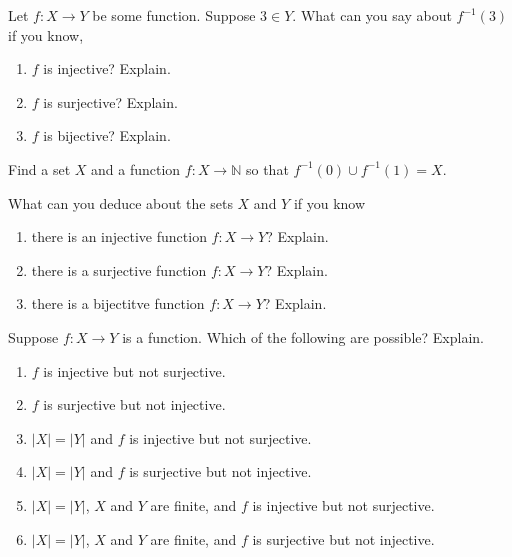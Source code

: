 \documentclass[10pt,]{book}
\theoremstyle{plain}
\theoremstyle{definition}
\theoremstyle{definition}
\theoremstyle{definition}
\theoremstyle{definition}
\numberwithin{equation}{chapter}
\def\N{\mathbb N}
\def\inv{^{-1}}
\begin{document}
\begin{divisionexercise}{9}\hypertarget{exercise-211}{}
\hypertarget{p-1838}{}%
Let \(f:X \to Y\) be some function. Suppose \(3 \in Y\). What can you say about \(f\inv(3)\) if you know, \leavevmode%
\begin{enumerate}[label=(\alph*)]
\item\hypertarget{li-605}{}\hypertarget{p-1839}{}%
\(f\) is injective? Explain.%
\item\hypertarget{li-606}{}\hypertarget{p-1840}{}%
\(f\) is surjective? Explain.%
\item\hypertarget{li-607}{}\hypertarget{p-1841}{}%
\(f\) is bijective? Explain.%
\end{enumerate}
%
\end{divisionexercise}%
\begin{divisionexercise}{10}\hypertarget{exercise-212}{}
\hypertarget{p-1846}{}%
Find a set \(X\) and a function \(f:X \to \N\) so that \(f\inv(0) \cup f\inv(1) = X\).%
\end{divisionexercise}%
\begin{divisionexercise}{11}\hypertarget{exercise-213}{}
\hypertarget{p-1848}{}%
What can you deduce about the sets \(X\) and \(Y\) if you know \textellipsis{} \leavevmode%
\begin{enumerate}[label=(\alph*)]
\item\hypertarget{li-611}{}\hypertarget{p-1849}{}%
there is an injective function \(f:X \to Y\)? Explain.%
\item\hypertarget{li-612}{}\hypertarget{p-1850}{}%
there is a surjective function \(f:X \to Y\)? Explain.%
\item\hypertarget{li-613}{}\hypertarget{p-1851}{}%
there is a bijectitve function \(f:X \to Y\)? Explain.%
\end{enumerate}
%
\end{divisionexercise}%
\begin{divisionexercise}{12}\hypertarget{exercise-214}{}
\hypertarget{p-1856}{}%
Suppose \(f:X \to Y\) is a function. Which of the following are possible? Explain. \leavevmode%
\begin{enumerate}[label=(\alph*)]
\item\hypertarget{li-617}{}\(f\) is injective but not surjective.%
\item\hypertarget{li-618}{}\(f\) is surjective but not injective.%
\item\hypertarget{li-619}{}\(|X| = |Y|\) and \(f\) is injective but not surjective.%
\item\hypertarget{li-620}{}\(|X| = |Y|\) and \(f\) is surjective but not injective.%
\item\hypertarget{li-621}{}\(|X| = |Y|\), \(X\) and \(Y\) are finite, and \(f\) is injective but not surjective.%
\item\hypertarget{li-622}{}\(|X| = |Y|\), \(X\) and \(Y\) are finite, and \(f\) is surjective but not injective.%
\end{enumerate}
%
\end{divisionexercise}%
\end{document}
